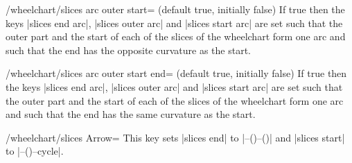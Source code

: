 \documentclass[a4paper,english,dvipsnames]{ltxdoc}
\begin{document}
\begin{key}{/wheelchart/slices arc outer start= (default true, initially false)}
If true then the keys |slices end arc|, |slices outer arc| and |slices start arc| are set such that the outer part and the start of each of the slices of the wheelchart form one arc and such that the end has the opposite curvature as the start.
\begin{codeexample}[width=10cm]
\begin{tikzpicture}
\wheelchart[
  data=,
  gap=0.1,
  slices arc inner start,
  slices arc outer start,
  slices style={
    \WCvarB!50,
    draw=\WCvarB,
    ultra thick
  },
  value=1,
  wheel data=\WCcount,
  wheel data pos=0.8
]{\exampleforthismanual}
\end{tikzpicture}
\end{codeexample}
\begin{codeexample}[]
\end{codeexample}
\end{key}
\begin{key}{/wheelchart/slices arc outer start end= (default true, initially false)}
If true then the keys |slices end arc|, |slices outer arc| and |slices start arc| are set such that the outer part and the start of each of the slices of the wheelchart form one arc and such that the end has the same curvature as the start.
\end{key}
\begin{key}{/wheelchart/slices Arrow=}
This key sets |slices end| to |--()--()| and |slices start| to |--()--cycle|.
\end{key}
\end{document}
